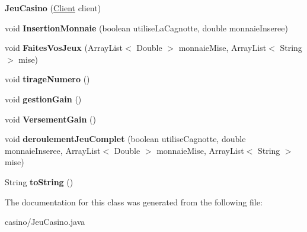 \begin{DoxyCompactItemize}
\item 
{\bfseries Jeu\+Casino} (\hyperlink{classclient_1_1_client}{Client} client)\hypertarget{classcasino_1_1_jeu_casino_a89253cecf6127a64971db659908a3fa6}{}\label{classcasino_1_1_jeu_casino_a89253cecf6127a64971db659908a3fa6}

\item 
void {\bfseries Insertion\+Monnaie} (boolean utilise\+La\+Cagnotte, double monnaie\+Inseree)\hypertarget{classcasino_1_1_jeu_casino_a285b3e8370e8fe3c437d0ae890b776bb}{}\label{classcasino_1_1_jeu_casino_a285b3e8370e8fe3c437d0ae890b776bb}

\item 
void {\bfseries Faites\+Vos\+Jeux} (Array\+List$<$ Double $>$ monnaie\+Mise, Array\+List$<$ String $>$ mise)\hypertarget{classcasino_1_1_jeu_casino_addf8b8e744f93f755c984191e7303674}{}\label{classcasino_1_1_jeu_casino_addf8b8e744f93f755c984191e7303674}

\item 
void {\bfseries tirage\+Numero} ()\hypertarget{classcasino_1_1_jeu_casino_ae047ff260857807fd81ff6fabfc2e401}{}\label{classcasino_1_1_jeu_casino_ae047ff260857807fd81ff6fabfc2e401}

\item 
void {\bfseries gestion\+Gain} ()\hypertarget{classcasino_1_1_jeu_casino_af6f2beda5cfbaa704805a0818a1c7415}{}\label{classcasino_1_1_jeu_casino_af6f2beda5cfbaa704805a0818a1c7415}

\item 
void {\bfseries Versement\+Gain} ()\hypertarget{classcasino_1_1_jeu_casino_a0fb4d5b6476b4b290987319dd4691061}{}\label{classcasino_1_1_jeu_casino_a0fb4d5b6476b4b290987319dd4691061}

\item 
void {\bfseries deroulement\+Jeu\+Complet} (boolean utilise\+Cagnotte, double monnaie\+Inseree, Array\+List$<$ Double $>$ monnaie\+Mise, Array\+List$<$ String $>$ mise)\hypertarget{classcasino_1_1_jeu_casino_a9532687038f2f9617f2b48c46f5c5fca}{}\label{classcasino_1_1_jeu_casino_a9532687038f2f9617f2b48c46f5c5fca}

\item 
String {\bfseries to\+String} ()\hypertarget{classcasino_1_1_jeu_casino_acc850777b656c514201d0b501274a497}{}\label{classcasino_1_1_jeu_casino_acc850777b656c514201d0b501274a497}

\end{DoxyCompactItemize}


The documentation for this class was generated from the following file\+:\begin{DoxyCompactItemize}
\item 
casino/Jeu\+Casino.\+java\end{DoxyCompactItemize}
